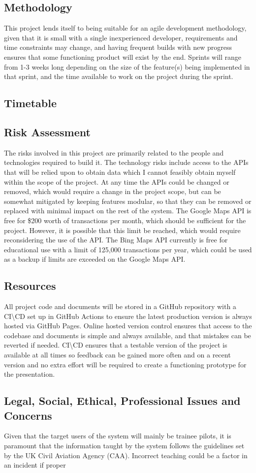 \subsection{Methodology}
This project lends itself to being suitable for an agile development methodology, given that it is small with a single inexperienced developer, requirements and time constraints may change, and having frequent builds with new progress ensures that some functioning product will exist by the end. Sprints will range from 1-3 weeks long depending on the size of the feature(s) being implemented in that sprint, and the time available to work on the project during the sprint.

\subsection{Timetable}


\subsection{Risk Assessment}
The risks involved in this project are primarily related to the people and technologies required to build it.
The technology risks include access to the APIs that will be relied upon to obtain data which I cannot feasibly obtain myself within the scope of the project.
At any time the APIs could be changed or removed, which would require a change in the project scope, but can be somewhat mitigated by keeping features modular, so that they can be removed or replaced with minimal impact on the rest of the system.
The Google Maps API is free for \$200 worth of transactions per month, which should be sufficient for the project. However, it is possible that this limit be reached, which would require reconsidering the use of the API.
The Bing Maps API currently is free for educational use with a limit of 125,000 transactions per year, which could be used as a backup if limits are exceeded on the Google Maps API.
\subsection{Resources}
All project code and documents will be stored in a GitHub repository with a CI\textbackslash CD set up in GitHub Actions to ensure the latest production version is always hosted via GitHub Pages. Online hosted version control ensures that access to the codebase and documents is simple and always available, and that mistakes can be reverted if needed. CI\textbackslash CD ensures that a testable version of the project is available at all times so feedback can be gained more often and on a recent version and no extra effort will be required to create a functioning prototype for the presentation.
\subsection{Legal, Social, Ethical, Professional Issues and Concerns}
Given that the target users of the system will mainly be trainee pilots, it is paramount that the information taught by the system follows the guidelines set by the UK Civil Aviation Agency (CAA). Incorrect teaching could be a factor in an incident if proper 